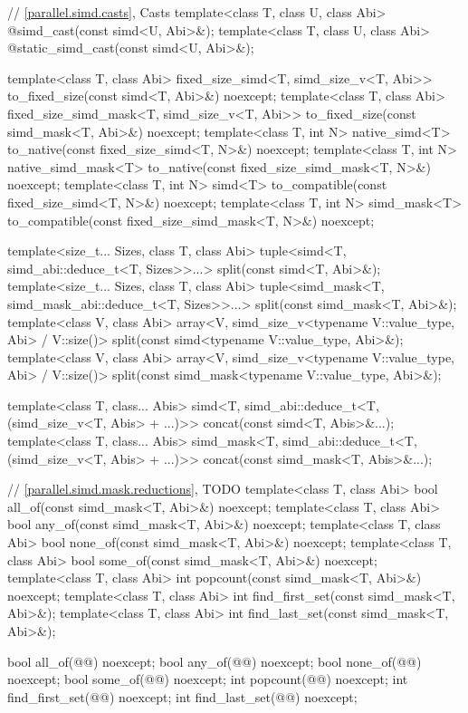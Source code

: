 \begin{codeblock}
{{    // \ref{parallel.simd.casts}, Casts
    template<class T, class U, class Abi> @\seebelow@ simd_cast(const simd<U, Abi>&);
    template<class T, class U, class Abi> @\seebelow@ static_simd_cast(const simd<U, Abi>&);

    template<class T, class Abi>
    fixed_size_simd<T, simd_size_v<T, Abi>>
    to_fixed_size(const simd<T, Abi>&) noexcept;
    template<class T, class Abi>
    fixed_size_simd_mask<T, simd_size_v<T, Abi>>
    to_fixed_size(const simd_mask<T, Abi>&) noexcept;
    template<class T, int N>
    native_simd<T> to_native(const fixed_size_simd<T, N>&) noexcept;
    template<class T, int N>
    native_simd_mask<T> to_native(const fixed_size_simd_mask<T, N>&) noexcept;
    template<class T, int N>
    simd<T> to_compatible(const fixed_size_simd<T, N>&) noexcept;
    template<class T, int N>
    simd_mask<T> to_compatible(const fixed_size_simd_mask<T, N>&) noexcept;

    template<size_t... Sizes, class T, class Abi>
    tuple<simd<T, simd_abi::deduce_t<T, Sizes>>...>
    split(const simd<T, Abi>&);
    template<size_t... Sizes, class T, class Abi>
    tuple<simd_mask<T, simd_mask_abi::deduce_t<T, Sizes>>...>
    split(const simd_mask<T, Abi>&);
    template<class V, class Abi>
    array<V, simd_size_v<typename V::value_type, Abi> / V::size()>
    split(const simd<typename V::value_type, Abi>&);
    template<class V, class Abi>
    array<V, simd_size_v<typename V::value_type, Abi> / V::size()>
    split(const simd_mask<typename V::value_type, Abi>&);

    template<class T, class... Abis>
    simd<T, simd_abi::deduce_t<T, (simd_size_v<T, Abis> + ...)>>
    concat(const simd<T, Abis>&...);
    template<class T, class... Abis>
    simd_mask<T, simd_abi::deduce_t<T, (simd_size_v<T, Abis> + ...)>>
    concat(const simd_mask<T, Abis>&...);

    // \ref{parallel.simd.mask.reductions}, TODO
    template<class T, class Abi> bool all_of(const simd_mask<T, Abi>&) noexcept;
    template<class T, class Abi> bool any_of(const simd_mask<T, Abi>&) noexcept;
    template<class T, class Abi> bool none_of(const simd_mask<T, Abi>&) noexcept;
    template<class T, class Abi> bool some_of(const simd_mask<T, Abi>&) noexcept;
    template<class T, class Abi> int popcount(const simd_mask<T, Abi>&) noexcept;
    template<class T, class Abi> int find_first_set(const simd_mask<T, Abi>&);
    template<class T, class Abi> int find_last_set(const simd_mask<T, Abi>&);

    bool all_of(@@) noexcept;
    bool any_of(@@) noexcept;
    bool none_of(@@) noexcept;
    bool some_of(@@) noexcept;
    int popcount(@@) noexcept;
    int find_first_set(@@) noexcept;
    int find_last_set(@@) noexcept;

}}
\end{codeblock}
